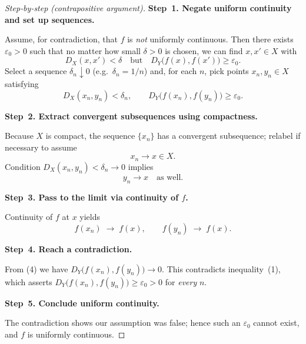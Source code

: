 \documentclass[12pt]{article}
\theoremstyle{definition} %
\theoremstyle{plain} %
\begin{document}
\begin{proof}[Step‑by‑step (contrapositive argument)]
  \textbf{Step 1.  Negate uniform continuity and set up sequences.}  

  Assume, for contradiction, that $f$ is \emph{not} uniformly
  continuous.
  Then there exists $\varepsilon_0>0$ such that
  no matter how small $\delta>0$ is chosen, we can find
  $x,x'\in X$ with
  \[
      D_X(x,x')<\delta
      \quad\text{but}\quad
      D_Y\!\bigl(f(x),f(x')\bigr)\ge\varepsilon_0.
  \]
  Select a sequence $\delta_n\downarrow0$ (e.g.\ $\delta_n=1/n$) and,
  for each $n$, pick points $x_n,y_n\in X$ satisfying
  \[
      D_X(x_n,y_n)<\delta_n, \qquad
      D_Y\!\bigl(f(x_n),f(y_n)\bigr)\ge\varepsilon_0. \tag{1}
  \]

  \medskip
  \textbf{Step 2.  Extract convergent subsequences using compactness.}

  Because $X$ is compact, the sequence $\{x_n\}$ has a convergent
  subsequence; relabel if necessary to assume
  \[
      x_n\longrightarrow x\in X. \tag{2}
  \]
  Condition $D_X(x_n,y_n)<\delta_n\to0$ implies
  \[
      y_n\longrightarrow x \quad\text{as well}. \tag{3}
  \]

  \medskip
  \textbf{Step 3.  Pass to the limit via continuity of $f$.}

  Continuity of $f$ at $x$ yields
  \[
      f(x_n)\;\longrightarrow\;f(x),
      \qquad
      f(y_n)\;\longrightarrow\;f(x). \tag{4}
  \]

  \medskip
  \textbf{Step 4.  Reach a contradiction.}

  From (4) we have
  \(
      D_Y\!\bigl(f(x_n),f(y_n)\bigr)\to 0.
  \)
  This contradicts inequality (1),
  which asserts
  \(
      D_Y\!\bigl(f(x_n),f(y_n)\bigr)\ge\varepsilon_0>0
  \)
  for \emph{every} $n$.

  \medskip
  \textbf{Step 5.  Conclude uniform continuity.}

  The contradiction shows our assumption was false; hence
  such an $\varepsilon_0$ cannot exist, and $f$ is uniformly continuous.
\end{proof}
\end{document}
